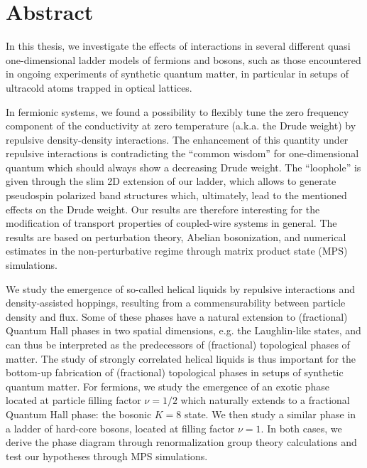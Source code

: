 %
\chapter*{Abstract}
%
In this thesis, we investigate the effects of interactions in several different quasi one-dimensional ladder models of fermions and bosons, such as those encountered in ongoing experiments of synthetic quantum matter, in particular in setups of ultracold atoms trapped in optical lattices.

In fermionic systems, we found a possibility to flexibly tune the zero frequency component of the conductivity at zero temperature (a.k.a. the Drude weight) by repulsive density-density interactions.
The enhancement of this quantity under repulsive interactions is contradicting the ``common wisdom'' for one-dimensional quantum which should always show a decreasing Drude weight.
The ``loophole'' is given through the slim 2D extension of our ladder, which allows to generate pseudospin polarized band structures which, ultimately, lead to the mentioned effects on the Drude weight.
Our results are therefore interesting for the modification of transport properties of coupled-wire systems in general.
The results are based on perturbation theory, Abelian bosonization, and numerical estimates in the non-perturbative regime through matrix product state (MPS) simulations.

We study the emergence of so-called helical liquids by repulsive interactions and density-assisted hoppings, resulting from a commensurability between particle density and flux.
Some of these phases have a natural extension to (fractional) Quantum Hall phases in two spatial dimensions, e.g. the Laughlin-like states, and can thus be interpreted as the predecessors of (fractional) topological phases of matter.
The study of strongly correlated helical liquids is thus important for the bottom-up fabrication of (fractional) topological phases in setups of synthetic quantum matter.
For fermions, we study the emergence of an exotic phase located at particle filling factor $\nu=1/2$ which naturally extends to a fractional Quantum Hall phase: the bosonic $K=8$ state.
We then study a similar phase in a ladder of hard-core bosons, located at filling factor $\nu=1$.
In both cases, we derive the phase diagram through renormalization group theory calculations and test our hypotheses through MPS simulations.

